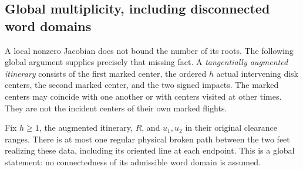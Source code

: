 \subsection{Global multiplicity, including disconnected word domains}
A local nonzero Jacobian does not bound the number of its roots.
The following global argument supplies precisely that missing fact.
A \emph{tangentially augmented itinerary} consists of the first marked
center, the ordered $h$ actual intervening disk centers, the second
marked center, and the two signed impacts. The marked centers may
coincide with one another or with centers visited at other times.
They are not the incident centers of their own marked flights.

\begin{theorem}
\label{thm:xf-unique}
Fix $h\ge1$, the augmented itinerary, $R$, and $u_1,u_2$ in their
original clearance ranges. There is at most one regular physical
broken path between the two feet realizing these data, including its
oriented line at each endpoint. This is a global statement: no
connectedness of its admissible word domain is assumed.
\end{theorem}
